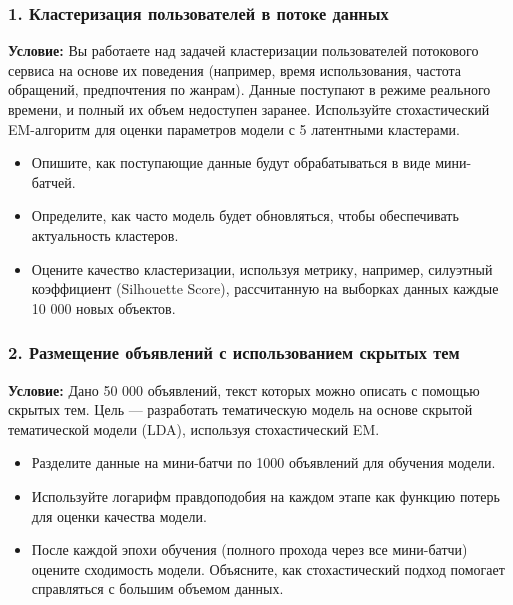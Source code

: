 \subsubsection*{1. Кластеризация пользователей в потоке данных}
\textbf{Условие:} Вы работаете над задачей кластеризации пользователей потокового сервиса на основе их поведения (например, время использования, частота обращений, предпочтения по жанрам). Данные поступают в режиме реального времени, и полный их объем недоступен заранее. Используйте стохастический EM-алгоритм для оценки параметров модели с 5 латентными кластерами.
\begin{itemize}
    \item Опишите, как поступающие данные будут обрабатываться в виде мини-батчей.
    \item Определите, как часто модель будет обновляться, чтобы обеспечивать актуальность кластеров.
    \item Оцените качество кластеризации, используя метрику, например, силуэтный коэффициент (Silhouette Score), рассчитанную на выборках данных каждые 10 000 новых объектов.
\end{itemize}

\subsubsection*{2. Размещение объявлений с использованием скрытых тем}
\textbf{Условие:} Дано 50 000 объявлений, текст которых можно описать с помощью скрытых тем. Цель — разработать тематическую модель на основе скрытой тематической модели (LDA), используя стохастический EM.
\begin{itemize}
    \item Разделите данные на мини-батчи по 1000 объявлений для обучения модели.
    \item Используйте логарифм правдоподобия на каждом этапе как функцию потерь для оценки качества модели.
    \item После каждой эпохи обучения (полного прохода через все мини-батчи) оцените сходимость модели. Объясните, как стохастический подход помогает справляться с большим объемом данных.
\end{itemize}

